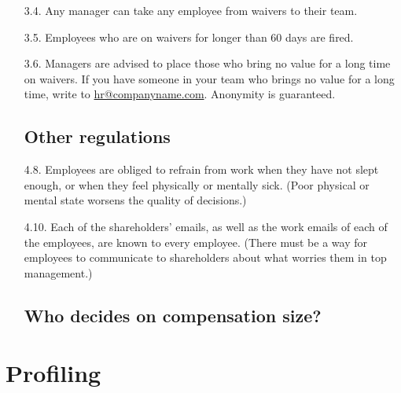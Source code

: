 \documentclass[11pt]{article}
\theoremstyle{remark}
\theoremstyle{definition}
\begin{document}
\begin{enumerate}
\item[3.4.] Any manager can take any employee from waivers to their team.

\item[3.5.] Employees who are on waivers for longer than 60 days are fired.


\item[3.6.] Managers are advised to place those who bring no value for a long time on waivers. If you have someone in your team who brings no value for a long time, write to \href{mailto:hr@companyname.com}{hr@companyname.com}. Anonymity is guaranteed.



\subsection{Other regulations}







\item[4.8.] Employees are obliged to refrain from work when they have not slept enough, or when they feel physically or mentally sick. (Poor physical or mental state worsens the quality of decisions.)




\item[4.10.] Each of the shareholders' emails, as well as the work emails of each of the employees, are known to every employee. (There must be a way for employees to communicate to shareholders about what worries them in top management.)


\subsection{Who decides on compensation size?}





\end{enumerate}











\section{Profiling}
\end{document}
